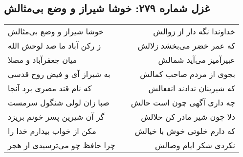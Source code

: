 \begin{center}
\section*{غزل شماره ۲۷۹: خوشا شیراز و وضع بی‌مثالش}
\label{sec:sh279}
\begin{longtable}{l p{0.5cm} r}
خوشا شیراز و وضع بی‌مثالش
&&
خداوندا نگه دار از زوالش
\\
ز رکن آباد ما صد لوحش الله
&&
که عمر خضر می‌بخشد زلالش
\\
میان جعفرآباد و مصلا
&&
عبیرآمیز می‌آید شمالش
\\
به شیراز آی و فیض روح قدسی
&&
بجوی از مردم صاحب کمالش
\\
که نام قند مصری برد آنجا
&&
که شیرینان ندادند انفعالش
\\
صبا زان لولی شنگول سرمست
&&
چه داری آگهی چون است حالش
\\
گر آن شیرین پسر خونم بریزد
&&
دلا چون شیر مادر کن حلالش
\\
مکن از خواب بیدارم خدا را
&&
که دارم خلوتی خوش با خیالش
\\
چرا حافظ چو می‌ترسیدی از هجر
&&
نکردی شکر ایام وصالش
\\
\end{longtable}
\end{center}

